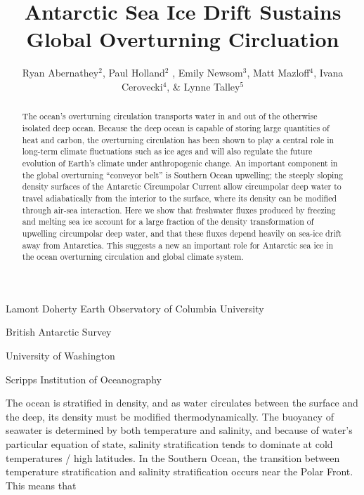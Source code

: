 \documentclass{naturemod}
\title{Antarctic Sea Ice Drift Sustains Global Overturning Circluation}
\author{Ryan Abernathey$^2$, Paul Holland$^2$ , Emily Newsom$^3$,
		Matt Mazloff$^4$, Ivana Cerovecki$^4$, \& Lynne Talley$^5$}
\begin{document}
\maketitle

\begin{affiliations}
 \item Lamont Doherty Earth Observatory of Columbia University
 \item British Antarctic Survey
 \item University of Washington
 \item Scripps Institution of Oceanography
\end{affiliations}

\begin{abstract}
The ocean's overturning circulation transports water in and out of the otherwise isolated deep ocean. Because the deep ocean is capable of storing large quantities of heat and carbon, the overturning circulation has been shown to play a central role in long-term climate fluctuations such as ice ages and will also regulate the future evolution of Earth's climate under anthropogenic change\citep{SigmanBoyle2000,ToggweilerRussell2008}. An important component in the global overturning ``conveyor belt'' is Southern Ocean upwelling; the steeply sloping density surfaces of the Antarctic Circumpolar Current allow circumpolar deep water to travel adiabatically from the interior to the surface, where its density can be modified through air-sea interaction. Here we show that freshwater fluxes produced by freezing and melting sea ice account for a large fraction of the density transformation of upwelling circumpolar deep water, and that these fluxes depend heavily on sea-ice drift away from Antarctica. This suggests a new an important role for Antarctic sea ice in the ocean overturning circulation and global climate system.
\end{abstract}



The ocean is stratified in density, and as water circulates between the surface and the deep, its density must be modified thermodynamically. The buoyancy of seawater is determined by both temperature and salinity, and because of water's particular equation of state, salinity stratification tends to dominate at cold temperatures / high latitudes. In the Southern Ocean, the transition between temperature stratification and salinity stratification occurs near the Polar Front. This means that 
\end{document}
